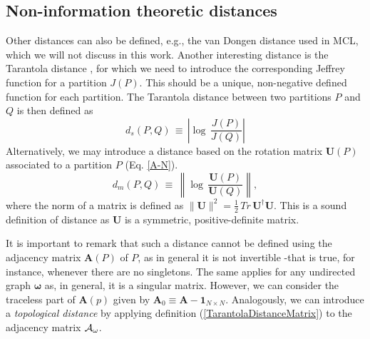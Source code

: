 \documentclass[twocolumn,aps,sort,nofootinbib]{revtex4}
\begin{document}
\begin{appendix}
\section{Non-information theoretic distances}
Other distances can also be defined, e.g., the van Dongen distance used in MCL, which
we will not discuss in this work. Another interesting distance is the Tarantola distance \cite{Tarantola},
for which we need to introduce the corresponding Jeffrey function for a partition
$J(P)$. This should be a unique, non-negative defined function for each partition.
The Tarantola distance between two partitions $P$ and $Q$ is then defined as
\begin{equation}
d_s(P,Q)\,\equiv\,\left|\log\,\frac{J(P)}{J(Q)}\right|
\end{equation}
Alternatively, we may introduce a distance based on the rotation matrix $\boldsymbol{U}(P)$ associated
to a partition $P$ (Eq. \ref{A-N}).
\begin{equation}
d_m(P,Q)\,\equiv\,\left\|\log\,\frac{\boldsymbol{U}(P)}{\boldsymbol{U}(Q)}\right\|,
\label{TarantolaDistanceMatrix}
\end{equation}
where the norm of a matrix is defined as 
$\|\boldsymbol{U}\|^2=\frac{1}{2}\,Tr\,\boldsymbol{U}^\dagger\boldsymbol{U}$.
This is a sound definition of distance as $\boldsymbol{U}$ is a symmetric, positive-definite matrix.

It is important to remark that 
such a distance cannot be defined using the adjacency matrix $\boldsymbol{A}(P)$ of
$P$, as in general it is not invertible -that is true, for instance, 
whenever there are no singletons.
The same applies for any
undirected graph $\boldsymbol{\omega}$  
as, in general, it is a singular matrix.
However, we can consider the traceless part of $\boldsymbol{A}(p)$
given by $\boldsymbol{A}_0\equiv\boldsymbol{A}-\boldsymbol{1}_{N\times N}$.
Analogously, we can introduce a {\sl topological distance} by
applying definition (\ref{TarantolaDistanceMatrix}) to the 
adjacency matrix ${\cal A}_\omega$.


\end{appendix}
\end{document}
